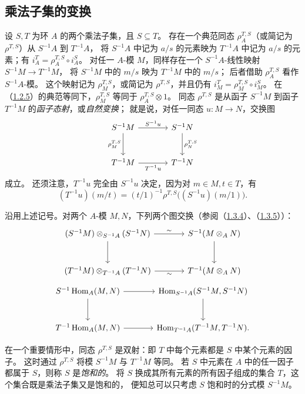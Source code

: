 \subsection{乘法子集的变换}\hypertarget{heading:0:1.4}{}

设 $S,T$ 为环 $A$ 的两个乘法子集，且 $S\subseteq T$。
存在一个典范同态 $\rho_A^{T,S}$（或简记为 $\rho^{T,S}$）从 $S^{-1}A$ 到 $T^{-1}A$，
将 $S^{-1}A$ 中记为 $a/s$ 的元素映为 $T^{-1}A$ 中记为 $a/s$ 的元素；有
$i_A^T=\rho_A^{T,S}\circ i_A^S$。
对任一 $A$-模 $M$，同样存在一个 $S^{-1}A$-线性映射 $S^{-1}M\to T^{-1}M$，
将 $S^{-1}M$ 中的 $m/s$ 映为 $T^{-1}M$ 中的 $m/s$；
后者借助 $\rho_A^{T,S}$ 看作 $S^{-1}A$-模。
这个映射记为 $\rho_M^{T,S}$，或简记为 $\rho^{T,S}$，并且仍有
$i_M^T=\rho_M^{T,S}\circ i_M^S$。
在（\hyperlink{para:0:1.2.5}{1.2.5}）的典范等同下，$\rho_M^{T,S}$ 等同于 $\rho_A^{T,S}\otimes1$。
同态 $\rho^{T,S}$ 是从函子 $S^{-1}M$ 到函子 $T^{-1}M$ 的\emph{函子态射}，或\emph{自然变换}；
就是说，对任一同态 $u\colon M\to N$，交换图
\[
\begin{tikzcd}[column sep=large,row sep=large]
S^{-1}M \arrow[r,"S^{-1}u"] \arrow[d,"\rho_M^{T,S}"'] & S^{-1}N \arrow[d,"\rho_N^{T,S}"]\\
T^{-1}M \arrow[r,"T^{-1}u"'] & T^{-1}N
\end{tikzcd}
\]
成立。
还须注意，$T^{-1}u$ 完全由 $S^{-1}u$ 决定，因为对 $m\in M,t\in T$，有
\[
 (T^{-1}u)(m/t)=(t/1)^{-1}\rho^{T,S}\bigl((S^{-1}u)(m/1)\bigr).
\]

沿用上述记号。对两个 $A$-模 $M,N$，下列两个图交换（参阅（\hyperlink{para:0:1.3.4}{1.3.4}）、（\hyperlink{para:0:1.3.5}{1.3.5}））：
\[
\begin{tikzcd}[column sep=large,row sep=large]
(S^{-1}M)\otimes_{S^{-1}A}(S^{-1}N) \arrow[r,"\sim"] \arrow[d] & S^{-1}(M\otimes_A N) \arrow[d]\\
(T^{-1}M)\otimes_{T^{-1}A}(T^{-1}N) \arrow[r,"\sim"'] & T^{-1}(M\otimes_A N)
\end{tikzcd}
\]
\[
\begin{tikzcd}[column sep=large,row sep=large]
S^{-1}\Hom_A(M,N) \arrow[r] \arrow[d] & \Hom_{S^{-1}A}(S^{-1}M,S^{-1}N) \arrow[d]\\
T^{-1}\Hom_A(M,N) \arrow[r] & \Hom_{T^{-1}A}(T^{-1}M,T^{-1}N).
\end{tikzcd}
\]

在一个重要情形中，同态 $\rho^{T,S}$ 是双射：即 $T$ 中每个元素都是 $S$ 中某个元素的因子。
这时通过 $\rho^{T,S}$ 将模 $S^{-1}M$ 与 $T^{-1}M$ 等同。
若 $S$ 中元素在 $A$ 中的任一因子都属于 $S$，则称 $S$ 是\emph{饱和的}。
将 $S$ 换成其所有元素的所有因子组成的集合 $T$，这个集合既是乘法子集又是饱和的，
便知总可以只考虑 $S$ 饱和时的分式模 $S^{-1}M$。

